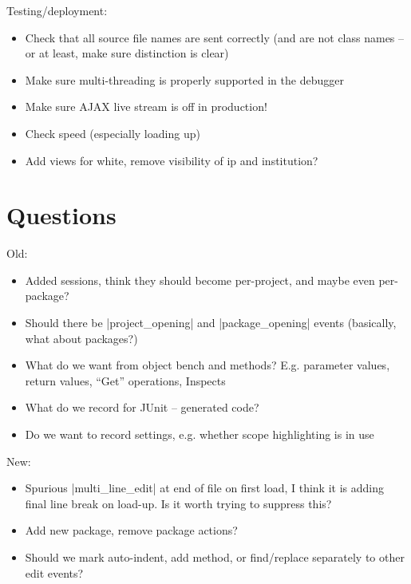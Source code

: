 \documentclass{book}
\begin{document}
Testing/deployment:

\begin{itemize}
\item Check that all source file names are sent correctly (and are not class
  names -- or at least, make sure distinction is clear)
\item Make sure multi-threading is properly supported in the debugger
\item Make sure AJAX live stream is off in production!
\item Check speed (especially loading up)
\item Add views for white, remove visibility of ip and institution?
\end{itemize}

\section{Questions}

Old:
\begin{itemize}
\item Added sessions, think they should become per-project, and maybe even per-package?
\item Should there be |project_opening| and |package_opening| events
  (basically, what about packages?)
\item What do we want from object bench and methods?  E.g. parameter values,
  return values, ``Get'' operations, Inspects
\item What do we record for JUnit -- generated code?
\item Do we want to record settings, e.g. whether scope highlighting is in
  use
\end{itemize}

New:
\begin{itemize}
\item Spurious |multi_line_edit| at end of file on first load, I think it is adding final
  line break on load-up.  Is it worth trying to suppress this?
\item Add new package, remove package actions?
\item Should we mark auto-indent, add method, or find/replace separately to other edit events?
\end{itemize}
\end{document}
